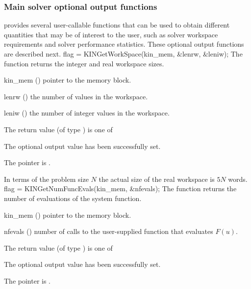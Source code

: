 \subsubsection{Main solver optional output functions}
{\kinsol} provides several user-callable functions that can be used to obtain
different quantities that may be of interest to the user, such as solver workspace
requirements and solver performance statistics.
These optional output functions are described next.
{
  flag = KINGetWorkSpace(kin\_mem, \&lenrw, \&leniw);
}
{
  The function  returns the
  {\kinsol} integer and real workspace sizes.
}
{
  \begin{args}
  \item[kin\_mem] ()
    pointer to the {\kinsol} memory block.
  \item[lenrw] ()
    the number of  values in the {\kinsol} workspace.
  \item[leniw] ()
    the number of integer values in the {\kinsol} workspace.
  \end{args}
}
{
  The return value  (of type ) is one of
  \begin{args}
  \item[\Id{KIN\_SUCCESS}] 
    The optional output value has been successfully set.
  \item[\Id{KIN\_MEM\_NULL}]
    The  pointer is .
  \end{args}
}
{
  In terms of the problem size $N$ the actual size of the real workspace 
  is $5 N$  words.
}
{
  flag = KINGetNumFuncEvals(kin\_mem, \&nfevals);
}
{
  The function  returns the number of evaluations
  of the system function.
}
{
  \begin{args}
  \item[kin\_mem] ()
    pointer to the {\kinsol} memory block.
  \item[nfevals] ()
    number of calls to the user-supplied function that evaluates $F(u)$.
  \end{args}
}
{
  The return value  (of type ) is one of
  \begin{args}
  \item[\Id{KIN\_SUCCESS}] 
    The optional output value has been successfully set.
  \item[\Id{KIN\_MEM\_NULL}]
    The  pointer is .
  \end{args}
}
